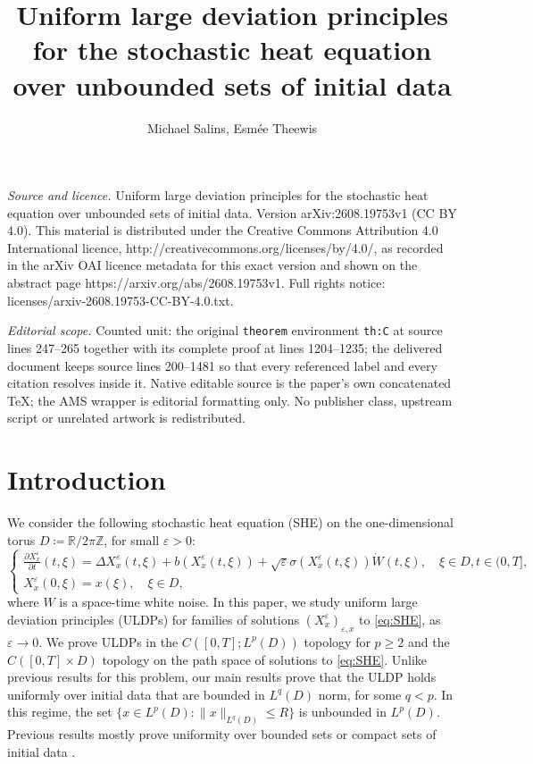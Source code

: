 \documentclass[10pt,a4paper]{amsart}
\numberwithin{equation}{section}
\newcommand{\Z}{\mathbb{Z}}
\newcommand{\R}{\mathbb{R}}
\newcommand{\ceqq}{\coloneqq}
\newcommand{\eps}{\varepsilon}
\begin{document}
\title[Uniform large deviation principles for the stochastic heat e]{Uniform large deviation principles for the stochastic heat equation over unbounded sets of initial data}
\author{Michael Salins, Esmée Theewis}
\date{}
\maketitle
\noindent\emph{Source and licence.} Uniform large deviation principles for the stochastic heat equation over unbounded sets of initial data. Version arXiv:2608.19753v1 (CC BY 4.0). This material is distributed under the Creative Commons Attribution 4.0 International licence, http://creativecommons.org/licenses/by/4.0/, as recorded in the arXiv OAI licence metadata for this exact version and shown on the abstract page https://arxiv.org/abs/2608.19753v1. Full rights notice: licenses/arxiv-2608.19753-CC-BY-4.0.txt.\par\smallskip
\noindent\textit{Editorial scope.} Counted unit: the original \texttt{theorem} environment \texttt{th:C} at source lines 247--265 together with its complete proof at lines 1204--1235; the delivered document keeps source lines 200--1481 so that every referenced label and every citation resolves inside it. Native editable source is the paper's own concatenated TeX; the AMS wrapper is editorial formatting only. No publisher class, upstream script or unrelated artwork is redistributed.
\section*{Introduction}
 
We consider the following stochastic heat equation (SHE)  
on the one-dimensional torus $D\ceqq \R/2\pi\Z$, for small $\eps>0$:  
\begin{equation}\label{eq:SHE}
\begin{cases}
\frac{\partial X_x^{\eps}}{\partial t}(t, \xi) = \Delta X_x^{\eps}(t, \xi) +b(X_x^{\eps}(t,\xi))+ \sqrt{\eps} \sigma(X_x^{\eps}(t, \xi))\dot{W}(t,\xi), \quad  \xi \in D, t \in(0,T], \\ 
X_x^{\eps}(0, \xi) = x(\xi), \quad\xi\in D,
\end{cases} 
\end{equation} 
where $W$ is a space-time white noise.  
In this paper, we study uniform large deviation principles (ULDPs) for families of solutions $(X^\eps_x)_{\eps,x}$ to \eqref{eq:SHE}, as $\eps\to 0$.  We prove ULDPs in the $C([0,T];L^p(D))$ topology  for $p\geq 2$ and the $C([0,T]\times D)$ topology on the path space of solutions to \eqref{eq:SHE}. 
Unlike previous results for this problem, our main results prove that the ULDP holds uniformly over initial data  that are bounded in $L^q(D)$ norm, for some $q<p$. In this regime, the set $\{x \in L^p(D): \|x\|_{L^q(D)} \leq R\}$ is    unbounded in $L^p(D)$. Previous results mostly prove uniformity over bounded sets or compact sets of initial data \cite{CR04,BDM08}.  
\end{document}
